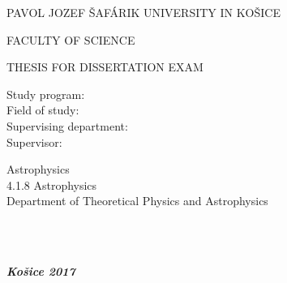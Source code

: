 \documentclass[12pt, english, 
oneside, 
onehalfspacing, %
toctotoc, %
headsepline, %
]{MastersDoctoralThesis} %
\begin{document}
\begin{titlepage}
\pagestyle{empty}
\begin{center}

{\scshape\Large PAVOL JOZEF \v{S}AF\'{A}RIK UNIVERSITY IN KO\v{S}ICE \par}\vspace{0.1cm} %
{\scshape\Large FACULTY OF SCIENCE \par}\vspace{3.5cm}


{\huge \bfseries \ttitle\par}\vspace{1.5cm} %

\MakeUppercase{\large Thesis for dissertation exam}\\[3.5cm]

\begin{minipage}[t]{0.35\textwidth}
\begin{flushleft} \large
{\small{Study program:}}\\[0.2cm] 
{\small{Field of study:}}\\[0.2cm] 
{\small{Supervising department:}}\\[0.2cm] 
{\small{Supervisor:}}\\[0.2cm] 
\end{flushleft}
\end{minipage}
\begin{minipage}[t]{0.6\textwidth}
\begin{flushright} \large
{\small{Astrophysics}}  \\[0.2cm]
{\small{4.1.8 Astrophysics}}  \\[0.2cm] 
{\small{Department of Theoretical Physics and Astrophysics}}  \\[0.2cm] 
{\small{\supname}}  \\[0.2cm] 
\end{flushright}
\end{minipage}\\[3cm]

\begin{minipage}[t]{0.4\textwidth}
\begin{flushleft} \large
\emph{\bfseries Ko\v{s}ice 2017} 
\end{flushleft}
\end{minipage}
\begin{minipage}[t]{0.4\textwidth}
\begin{flushright} \large
{\bfseries \authorname} %
\end{flushright}
\end{minipage}\\[1cm]
\vfill
\end{center}
\end{titlepage}
\end{document}
